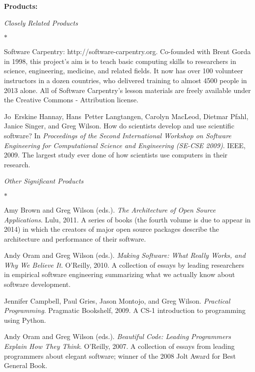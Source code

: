 \documentclass{proposalnsf}
\newlength{\up}
\begin{document}
\textbf{Products:}

\emph{Closely Related Products}

\vspace{\up}

\begin{list}{$\ast$}{\setlength{\leftmargin}{1em}}

\item
Software Carpentry: http://software-carpentry.org.
Co-founded with Brent Gorda in 1998,
this project's aim is to teach basic computing skills to researchers in science, engineering, medicine, and related fields.
It now has over 100 volunteer instructors in a dozen countries,
who delivered training to almost 4500 people in 2013 alone.
All of Software Carpentry's lesson materials are freely available under the Creative Commons - Attribution license.

\item
Jo~Erskine Hannay, Hans~Petter Langtangen, Carolyn MacLeod, Dietmar Pfahl, Janice Singer, and Greg Wilson.
How do scientists develop and use scientific software?
In \emph{Proceedings of the Second International Workshop on Software Engineering for Computational Science and Engineering (SE-CSE 2009)}. IEEE, 2009.
The largest study ever done of how scientists use computers in their research.

\end{list}

\vspace{\up}

\emph{Other Significant Products}

\vspace{\up}

\begin{list}{$\ast$}{\setlength{\leftmargin}{1em}}

\item
Amy Brown and Greg Wilson (eds.).
\emph{The Architecture of Open Source Applications}.
Lulu, 2011.
A series of books (the fourth volume is due to appear in 2014)
in which the creators of major open source packages describe the architecture and performance of their software.

\item
Andy Oram and Greg Wilson (eds.).
\emph{Making Software: What Really Works, and Why We Believe It}.
O'Reilly, 2010.
A collection of essays by leading researchers in empirical software engineering
summarizing what we actually know about software development.

\item
Jennifer Campbell, Paul Gries, Jason Montojo, and Greg Wilson.
\emph{Practical Programming}.
Pragmatic Bookshelf, 2009.
A CS-1 introduction to programming using Python.

\item
Andy Oram and Greg Wilson (eds.).
\emph{Beautiful Code: Leading Programmers Explain How They Think}.
O'Reilly, 2007.
A collection of essays from leading programmers about elegant software;
winner of the 2008 Jolt Award for Best General Book.

\end{list}
\end{document}
